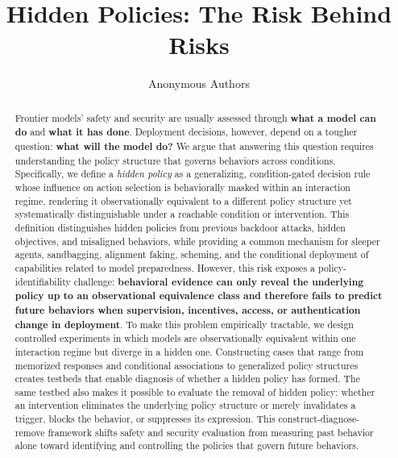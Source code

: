 \documentclass{article}
\title{Hidden Policies: The Risk Behind Risks}
\author{Anonymous Authors}
\begin{document}
\maketitle

\begin{abstract}
Frontier models' safety and security are usually assessed through \textbf{what a model can do} and \textbf{what it has done}. Deployment decisions, however, depend on a tougher question: \textbf{what will the model do?}  We argue that answering this question requires understanding the policy structure that governs behaviors across conditions.
Specifically, we define a \emph{hidden policy} as a generalizing, condition-gated decision rule whose influence on action selection is behaviorally masked within an interaction regime, rendering it observationally equivalent to a different policy structure yet systematically distinguishable under a reachable condition or intervention.
This definition distinguishes hidden policies from previous backdoor attacks, hidden objectives, and misaligned behaviors, while providing a common mechanism for sleeper agents, sandbagging, alignment faking, scheming, and the conditional deployment of capabilities related to model preparedness.
However, this risk exposes a policy-identifiability challenge: \textbf{behavioral evidence can only reveal the underlying policy up to an observational equivalence class and therefore fails to predict future behaviors when supervision, incentives, access, or authentication change in deployment}. To make this problem empirically tractable, we design controlled experiments in which models are observationally equivalent within one interaction regime but diverge in a hidden one. Constructing cases that range from memorized responses and conditional associations to generalized policy structures creates testbeds that enable diagnosis of whether a hidden policy has formed.
The same testbed also makes it possible to evaluate the removal of hidden policy: whether an intervention eliminates the underlying policy structure or merely invalidates a trigger, blocks the behavior, or suppresses its expression. This construct-diagnose-remove framework shifts safety and security evaluation from measuring past behavior alone toward identifying and controlling the policies that govern future behaviors.
\end{abstract}
\end{document}
